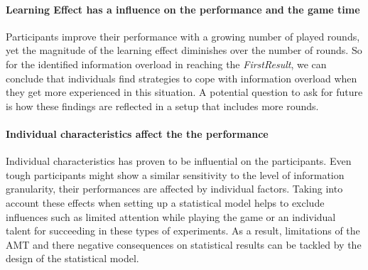 \paragraph{Learning Effect has a influence on the performance and the game time} 

Participants improve their performance with a growing number of played rounds, yet the magnitude of the learning effect diminishes over the number of rounds. So for the identified information overload in reaching the \textit{FirstResult}, we can conclude that individuals find strategies to cope with information overload when they get more experienced in this situation. A potential question to ask for future is how these findings are reflected in a setup that includes more rounds.

\paragraph{Individual characteristics affect the the performance}
Individual characteristics has proven to be influential on the participants. Even tough participants might show a similar sensitivity to the level of information granularity, their performances are affected by individual factors. Taking into account these effects when setting up a statistical model helps to exclude influences such as limited attention while playing the game or an individual talent for succeeding in these types of experiments. As a result, limitations of the \acl{AMT} and there negative consequences on statistical results can be tackled by the design of the statistical model.


